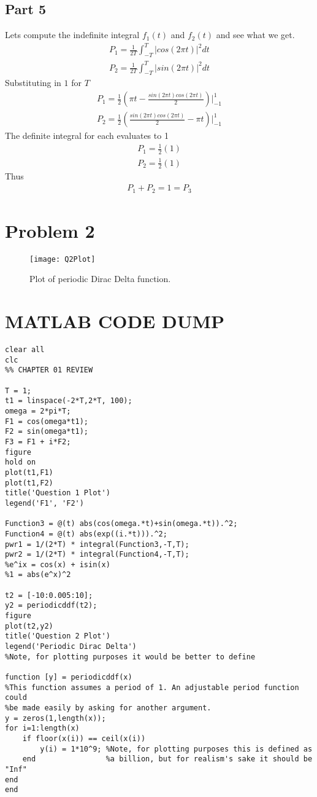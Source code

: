 \documentclass{article}
\numberwithin{equation}{section}
\begin{document}
\subsection{Part 5}
Lets compute the indefinite integral $f_1(t)$ and $f_2(t)$ and see what we get.
\begin{align*}
P_1 = \frac{1}{2T} \int_{-T}^{T} |cos(2\pi t)|^2 dt \\ P_2 = \frac{1}{2T} \int_{-T}^{T} |sin(2\pi t)|^2 dt
\end{align*}
Substituting in $1$ for $T$
\begin{align*}
P_1 = \frac{1}{2} (\pi t - \frac{sin(2\pi t)cos(2\pi t)}{2})|_{-1}^{1} \\ P_2 = \frac{1}{2} (\frac{sin(2\pi t)cos(2\pi t)}{2} - \pi t)|_{-1}^{1}
\end{align*}
The definite integral for each evaluates to 1
\begin{align*}
P_1 = \frac{1}{2} (1) \\ P_2 = \frac{1}{2} (1)
\end{align*}
Thus
\begin{align*}
\boxed{P_1 + P_2 = 1 = P_3}
\end{align*}
\clearpage
\section{Problem 2}
\begin{figure}[hbt!]
\centering
\texttt{[image: Q2Plot]}
\caption{Plot of periodic Dirac Delta function.}
\end{figure}

\section{MATLAB CODE DUMP}
\begin{verbatim}
clear all
clc
%% CHAPTER 01 REVIEW

T = 1;
t1 = linspace(-2*T,2*T, 100);
omega = 2*pi*T;
F1 = cos(omega*t1);
F2 = sin(omega*t1);
F3 = F1 + i*F2;
figure
hold on
plot(t1,F1)
plot(t1,F2)
title('Question 1 Plot')
legend('F1', 'F2')

Function3 = @(t) abs(cos(omega.*t)+sin(omega.*t)).^2;
Function4 = @(t) abs(exp((i.*t))).^2;
pwr1 = 1/(2*T) * integral(Function3,-T,T);
pwr2 = 1/(2*T) * integral(Function4,-T,T);
%e^ix = cos(x) + isin(x)
%1 = abs(e^x)^2

t2 = [-10:0.005:10];
y2 = periodicddf(t2);
figure
plot(t2,y2)
title('Question 2 Plot')
legend('Periodic Dirac Delta')
%Note, for plotting purposes it would be better to define 

function [y] = periodicddf(x)
%This function assumes a period of 1. An adjustable period function could
%be made easily by asking for another argument.
y = zeros(1,length(x));
for i=1:length(x)    
    if floor(x(i)) == ceil(x(i))
        y(i) = 1*10^9; %Note, for plotting purposes this is defined as
    end                %a billion, but for realism's sake it should be "Inf"
end
end
\end{verbatim}
\end{document}
